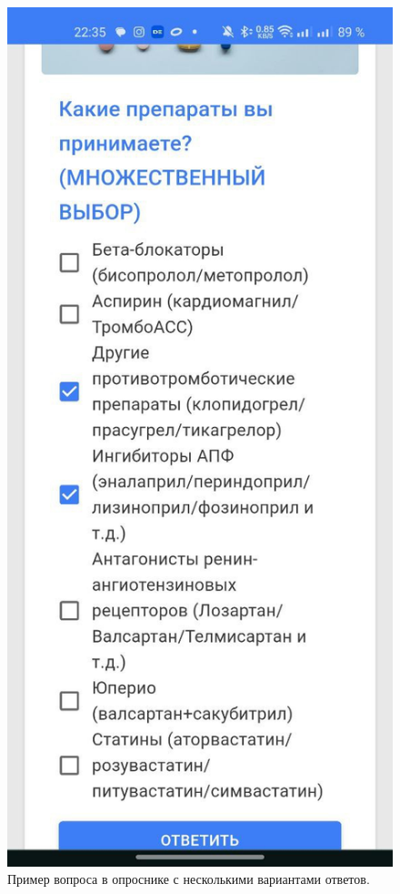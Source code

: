 \begin{figure}[htbp]
    \centering
    \includegraphics[height=\dimexpr\textheight/3\relax]{images/screenshots/process_inquirer_multi}
    \caption{Пример вопроса в опроснике с несколькими вариантами ответов.}
    \label{fig:figure56}
\end{figure}

